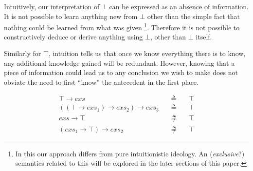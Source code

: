 \documentclass[a4paper,11pt]{article}
\begin{document}
Intuitively, our interpretation of $\bot$ can be expressed as an absence of information.
It is not possible to learn anything new from $\bot$ other than the simple fact that nothing could be learned from what was given
\footnote{In this our approach differs from pure intuitionistic ideology. An (\emph{exclusive}?) semantics related to this will be explored in the later sections of this paper.}.
Therefore it is not possible to constructively deduce or derive anything using $\bot$, other than $\bot$ itself.

Similarly for $\top$, intuition tells us that once we know everything there is to know, any additional knowledge gained will be redundant.
However, knowing that a piece of information could lead us to any conclusion we wish to make does not obviate the need to first ``know'' the antecedent in the first place.

\begin{eqnarray*}
\top \rightarrow exs \quad&\triangleq&\quad \top \\
((\top \rightarrow exs_1) \rightarrow exs_2) \rightarrow exs_3 \quad&\triangleq&\quad \top \\
exs \rightarrow \top \quad&\not\triangleq&\quad \top\\
(exs_1 \rightarrow \top) \rightarrow exs_2 \quad&\not\triangleq&\quad \top
\end{eqnarray*}
\end{document}
